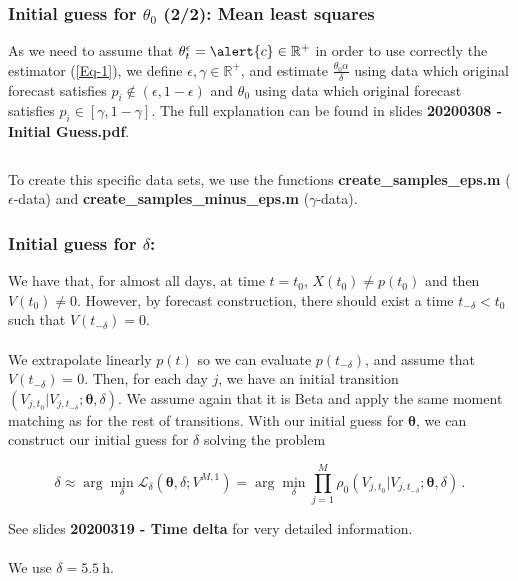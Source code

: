 \documentclass[aspectratio=169]{beamer}\usepackage[utf8]{inputenc}
\newcommand{\R}{\mathbb{R}}
\begin{document}

\begin{frame}\frametitle{Initial guess for $\theta_0$ (2/2): Mean least squares}

As we need to assume that $\theta_t^\epsilon=\alert{c}\in\R^+$ in order to use correctly the estimator (\ref{Eq-1}), we define $\epsilon,\gamma\in\R^+$, and estimate $\frac{\theta_0\alpha}{\delta}$ using data which original forecast satisfies $p_i\notin(\epsilon,1-\epsilon)$ and $\theta_0$ using data which original forecast satisfies $p_i\in[\gamma,1-\gamma]$. The full explanation can be found in slides \textbf{20200308 - Initial Guess.pdf}.

\begin{center}
\begin{tabular}{|c|}
\toprule
{\tiny

}\\
\bottomrule
\end{tabular}
\end{center}
To create this specific data sets, we use the functions \textbf{create\_samples\_eps.m} ($\epsilon$-data) and \textbf{create\_samples\_minus\_eps.m} ($\gamma$-data).

\end{frame}


\begin{frame}\frametitle{Initial guess for $\delta$:}

We have that, for almost all days, at time $t=t_0$, $X(t_0)\neq p(t_0)$ and then $V(t_0)\neq0$. However, by forecast construction, there should exist a time $t_{-\delta}<t_0$ such that $V(t_{-\delta})=0$.\\
\quad\\
We extrapolate linearly $p(t)$ so we can evaluate $p(t_{-\delta})$, and assume that $V(t_{-\delta})=0$. Then, for each day $j$, we have an initial transition $(V_{j, t_0}|V_{j, t_{-\delta}};\bm{\theta},\delta)$. We assume again that it is Beta and apply the same moment matching as for the rest of transitions. With our initial guess for $\bm{\theta}$, we can construct our initial guess for $\delta$ solving the problem

\begin{equation*}
\delta\approx\arg\min_{\delta}\mathcal{L}_{\delta}(\bm{\theta},\delta; V^{M,1}) = \arg\min_{\delta}\prod\limits_{j=1}^M \rho_0 (V_{j, t_0}|V_{j, t_{-\delta}};\bm{\theta},\delta) \,.
\label{likelihood_delta}
\end{equation*}

See slides \textbf{20200319 - Time delta} for very detailed information.\\
\quad\\
We use $\delta=\SI{5.5}{\hour}$.

\end{frame}
\end{document}
